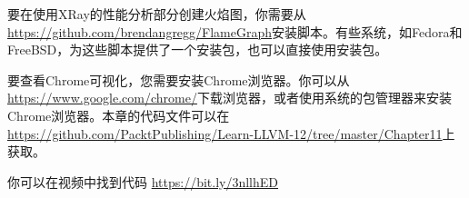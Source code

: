 要在使用XRay的性能分析部分创建火焰图，你需要从\url{https://github.com/brendangregg/FlameGraph}安装脚本。有些系统，如Fedora和FreeBSD，为这些脚本提供了一个安装包，也可以直接使用安装包。\par

要查看Chrome可视化，您需要安装Chrome浏览器。你可以从\url{https://www.google.com/chrome/}下载浏览器，或者使用系统的包管理器来安装Chrome浏览器。本章的代码文件可以在\url{https://github.com/PacktPublishing/Learn-LLVM-12/tree/master/Chapter11}上获取。

你可以在视频中找到代码 \url{https://bit.ly/3nllhED}